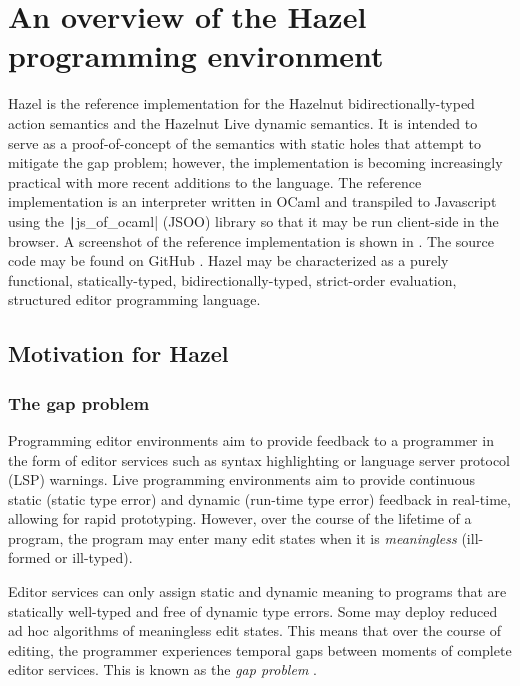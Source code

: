 \chapter{An overview of the Hazel programming environment}
\label{sec:hazel}

Hazel is the reference implementation for the Hazelnut bidirectionally-typed action semantics and the Hazelnut Live dynamic semantics. It is intended to serve as a proof-of-concept of the semantics with static holes that attempt to mitigate the gap problem; however, the implementation is becoming increasingly practical with more recent additions to the language. The reference implementation is an interpreter written in OCaml and transpiled to Javascript using the \texttt|js_of_ocaml| (JSOO) library \cite{vouillon2014bytecode} so that it may be run client-side in the browser. A screenshot of the reference implementation is shown in  \cite{HazelDemo2022}. The source code may be found on GitHub \cite{Hazel2022}. Hazel may be characterized as a purely functional, statically-typed, bidirectionally-typed, strict-order evaluation, structured editor programming language.

\section{Motivation for Hazel}
\label{sec:hazel-motivation}

\subsection{The gap problem}
\label{sec:gap-problem}

Programming editor environments aim to provide feedback to a programmer in the form of editor services such as syntax highlighting or language server protocol (LSP) warnings. Live programming environments aim to provide continuous static (static type error) and dynamic (run-time type error) feedback in real-time, allowing for rapid prototyping. However, over the course of the lifetime of a program, the program may enter many edit states when it is \textit{meaningless} (ill-formed or ill-typed).

Editor services can only assign static and dynamic meaning to programs that are statically well-typed and free of dynamic type errors. Some may deploy reduced ad hoc algorithms of meaningless edit states. This means that over the course of editing, the programmer experiences temporal gaps between moments of complete editor services. This is known as the \textit{gap problem} \cite{10.1145/2499370.2462170,conf/popl/HazelnutLive19}.

